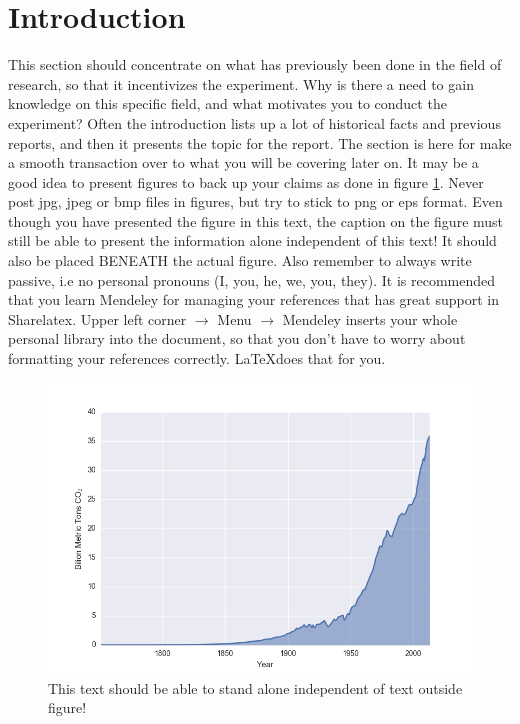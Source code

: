 \section{Introduction}
\label{sec:introduction}
\FloatBarrier %
This section should concentrate on what has previously been done in the field of research, so that it incentivizes the experiment. Why is there a need to gain knowledge on this specific field, and what motivates you to conduct the experiment? Often the introduction lists up a lot of historical facts and previous reports, and then it presents the topic for the report. The section is here for make a smooth transaction over to what you will be covering later on. It may be a good idea to present figures to back up your claims as done in figure \ref{fig:intro_co2}. Never post jpg, jpeg or bmp files in figures, but try to stick to png or eps format. Even though you have presented the figure in this text, the caption on the figure must still be able to present the information alone independent of this text! It should also be placed BENEATH the actual figure. Also remember to always write passive, i.e no personal pronouns (I, you, he, we, you, they). It is recommended that you learn Mendeley for managing your references that has great support in Sharelatex. Upper left corner $\rightarrow$ Menu $\rightarrow$ Mendeley inserts your whole personal library into the document, so that you don't have to worry about formatting your references correctly. \LaTeX does that for you.
\begin{figure}[htb] %
    \centering
    \includegraphics[scale=0.45]{Introduction/figures/Historic_CO2_Emission}
    \caption{This text should be able to stand alone independent of text outside figure!}
    \label{fig:intro_co2}
\end{figure}